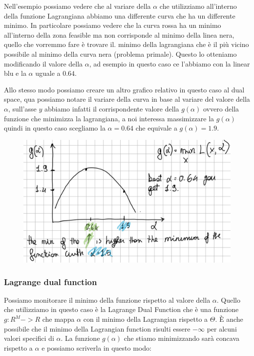 \documentclass[14pt]{extreport}
\begin{document}
Nell'esempio possiamo vedere che al variare della $\alpha$ che utilizziamo all'interno della funzione Lagrangiana abbiamo una differente curva che ha
un differente minimo. In particolare possiamo vedere che la curva rossa ha un minimo all'interno della zona feasible ma non corrisponde al minimo
della linea nera, quello che vorremmo fare è trovare il. minimo della lagrangiana che è il più vicino possibile al minimo della curva nera (problema
primale). Questo lo otteniamo modificando il valore della $\alpha$, ad esempio in questo caso ce l'abbiamo con la linear blu e la $\alpha$ uguale a
$0.64$.

Allo stesso modo possiamo creare un altro grafico relativo in questo caso al dual space, qua possiamo notare il variare della curva in base al variare
del valore della $\alpha$, sull'asse $y$ abbiamo infatti il corrispondente valore della $g(\alpha)$ ovvero della funzione che minimizza la
lagrangiana, a noi interessa massimizzare la $g(\alpha)$ quindi in questo caso scegliamo la $\alpha = 0.64$ che equivale a $g(\alpha) = 1.9$.

\begin{figure}[H]
\centering
\includegraphics[width=0.7\linewidth]{307.jpeg}
\end{figure}

\subsubsection{Lagrange dual function}

Possiamo monitorare il minimo della funzione rispetto al valore della $\alpha$. Quello che utilizziamo in questo caso è la Lagrange Dual Function che
è una funzione $g: R^M->R$ che mappa $\alpha$ con il minimo della Lagrangian rispetto a $\Theta$. È anche possibile che il minimo della Lagrangian
function risulti essere $-\infty$ per alcuni valori specifici di $\alpha$. La funzione $g(\alpha)$ che stiamo minimizzando sarà concava rispetto a
$\alpha$ e possiamo scriverla in questo modo:
\end{document}
